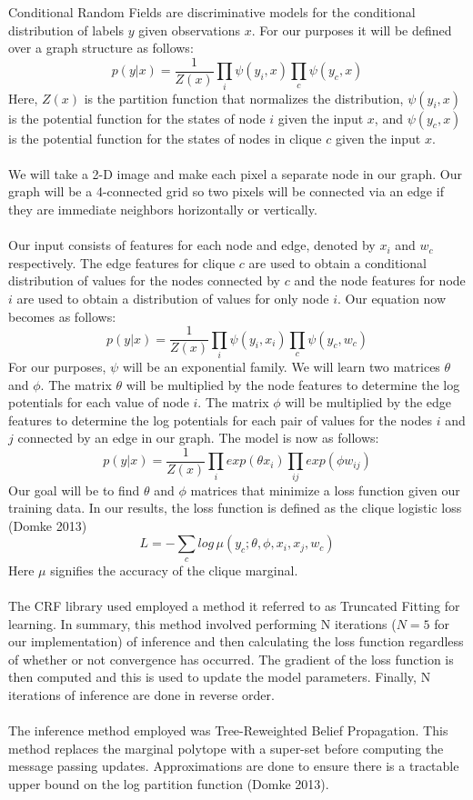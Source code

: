 Conditional Random Fields are discriminative models for the conditional distribution of labels $y$ given observations $x$. For our purposes it will be defined over a graph structure as follows:
\[
p(y|x) = \frac{1}{Z(x)} \prod_i{\psi(y_i,x)} \prod_{c}{\psi(y_c,x)}
\]
Here, $Z(x)$ is the partition function that normalizes the distribution, $\psi(y_i,x)$ is the potential function for the states of node $i$ given the input $x$, and $\psi(y_c,x)$ is the potential function for the states of nodes in clique $c$ given the input $x$. \\
\\
We will take a 2-D image and make each pixel a separate node in our graph. Our graph will be a 4-connected grid so two pixels will be connected via an edge if they are immediate neighbors horizontally or vertically. \\
\\
Our input consists of features for each node and edge, denoted by $x_i$ and $w_c$ respectively. The edge features for clique $c$ are used to obtain a conditional distribution of values for the nodes connected by $c$ and the node features for node $i$ are used to obtain a distribution of values for only node $i$. Our equation now becomes as follows:
\[
p(y|x) = \frac{1}{Z(x)} \prod_i{\psi(y_i,x_i)} \prod_{c}{\psi(y_c,w_c)}
\]
For our purposes, $\psi$ will be an exponential family. We will learn two matrices $\theta$ and $\phi$. The matrix $\theta$ will be multiplied by the node features to determine the log potentials for each value of node $i$. The matrix $\phi$ will be multiplied by the edge features to determine the log potentials for each pair of values for the nodes $i$ and $j$ connected by an edge in our graph. The model is now as follows:
\[
p(y|x) = \frac{1}{Z(x)} \prod_i{exp(\theta x_i)} \prod_{ij}{exp(\phi w_{ij})}
\]
Our goal will be to find $\theta$ and $\phi$ matrices that minimize a loss function given our training data. In our results, the loss function is defined as the clique logistic loss (Domke 2013)
\[
L = - \sum_c {log \, \mu(y_c; \theta, \phi, x_i, x_j, w_c)}
\]
Here $\mu$ signifies the accuracy of the clique marginal. \\
\\
The CRF library used employed a method it referred to as Truncated Fitting for learning. In summary, this method involved performing N iterations ($N=5$ for our implementation) of inference and then calculating the loss function regardless of whether or not convergence has occurred. The gradient of the loss function is then computed and this is used to update the model parameters. Finally, N iterations of inference are done in reverse order.  \\
\\
The inference method employed was Tree-Reweighted Belief Propagation. This method replaces the marginal polytope with a super-set before computing the message passing updates. Approximations are done to ensure there is a tractable upper bound on the log partition function (Domke 2013). 

